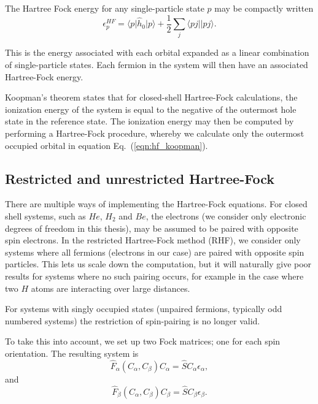 The Hartree Fock energy for any single-particle state $p$ may be compactly written
\begin{equation}
\epsilon^{HF}_p = \langle p \vert \hat{h}_0 \vert p \rangle + \frac{1}{2} \sum_{j} \langle pj \vert  \vert pj \rangle .
\label{eqn:hf_koopman}
\end{equation}

This is the energy associated with each orbital expanded as a linear combination of single-particle states. Each fermion in the system will then have an associated Hartree-Fock energy.

Koopman's theorem states that for closed-shell Hartree-Fock
calculations, the ionization energy of the system is equal to the
negative of the outermost hole state in the reference state. \cite{Thijssen}
The ionization energy may then be computed by performing a Hartree-Fock procedure, 
whereby we calculate only the outermost occupied
orbital in equation Eq.~(\ref{eqn:hf_koopman}).

\subsection{Restricted and unrestricted Hartree-Fock}

There are multiple ways of implementing the Hartree-Fock
equations. For closed shell systems, such as $He$, $H_2$ and $Be$, the
electrons (we consider only electronic degrees of freedom in this thesis), may be assumed to be paired with
opposite spin electrons. In the restricted Hartree-Fock method (RHF),
we consider only systems where all fermions (electrons in our case) are paired with opposite
spin particles. This lets us scale down the computation, but it will
naturally give poor results for systems where no such pairing occurs,
for example in the case where two $H$ atoms are interacting over
large distances.

For systems with singly occupied states (unpaired fermions, typically
odd numbered systems) the restriction of spin-pairing is no longer valid.

To take this into account, we set up two Fock matrices; one for each
spin orientation. The resulting system is
\begin{equation}
\hat{F}_\alpha(C_\alpha, C_\beta) C_\alpha = \hat{S} C_\alpha \epsilon_\alpha,
\end{equation}
and
\begin{equation}
\hat{F}_\beta(C_\alpha, C_\beta) C_\beta = \hat{S} C_\beta \epsilon_\beta.
\end{equation}

